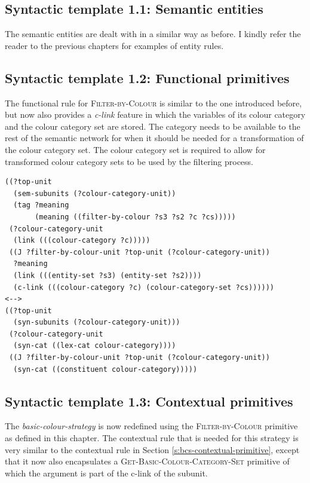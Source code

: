 \subsection{Syntactic template 1.1: Semantic entities}

The semantic entities are dealt with in a similar way as before. I
kindly refer the reader to the previous chapters for examples of
entity rules.

\subsection{Syntactic template 1.2: Functional primitives}

The functional rule for \textsc{Filter-by-Colour} is similar to the
one introduced before, but now also provides a \emph{c-link} feature
in which the variables of its colour category and the colour category
set are stored. The category needs to be available to the rest of the
semantic network for when it should be needed for a transformation of
the colour category set. The colour category set is required to allow
for transformed colour category sets to be used by the filtering
process.

\footnotesize
\begin{Verbatim}[frame=lines, label=Functional rule for Filter-by-Colour]
((?top-unit
  (sem-subunits (?colour-category-unit)) 
  (tag ?meaning
       (meaning ((filter-by-colour ?s3 ?s2 ?c ?cs)))))
 (?colour-category-unit 
  (link (((colour-category ?c)))))
 ((J ?filter-by-colour-unit ?top-unit (?colour-category-unit))
  ?meaning
  (link (((entity-set ?s3) (entity-set ?s2))))
  (c-link (((colour-category ?c) (colour-category-set ?cs))))))
<-->
((?top-unit 
  (syn-subunits (?colour-category-unit)))
 (?colour-category-unit 
  (syn-cat ((lex-cat colour-category))))
 ((J ?filter-by-colour-unit ?top-unit (?colour-category-unit))
  (syn-cat ((constituent colour-category)))))
\end{Verbatim}
\normalsize

\subsection{Syntactic template 1.3: Contextual primitives}

The \emph{basic-colour-strategy} is now redefined 
using the \textsc{Filter-by-Colour} primitive as defined in this
chapter. The contextual rule that is needed for this strategy
is very similar to the contextual rule in Section
\ref{s:bcs-contextual-primitive}, except that it now also encapsulates
a \textsc{Get-Basic-Colour-Category-Set} primitive of which the argument is part of
the c-link of the subunit.

